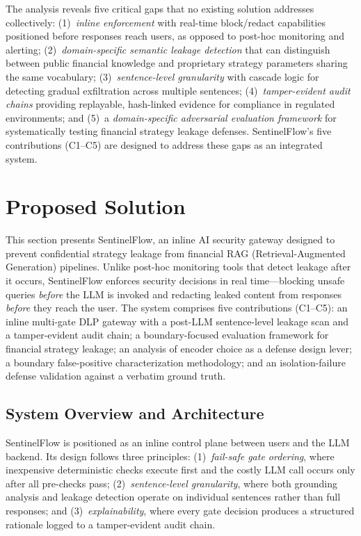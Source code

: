\documentclass[journal]{IEEEtran}
\begin{document}
The analysis reveals five critical gaps that no existing solution addresses collectively: (1)~\textit{inline enforcement} with real-time block/redact capabilities positioned before responses reach users, as opposed to post-hoc monitoring and alerting; (2)~\textit{domain-specific semantic leakage detection} that can distinguish between public financial knowledge and proprietary strategy parameters sharing the same vocabulary; (3)~\textit{sentence-level granularity} with cascade logic for detecting gradual exfiltration across multiple sentences; (4)~\textit{tamper-evident audit chains} providing replayable, hash-linked evidence for compliance in regulated environments; and (5)~a \textit{domain-specific adversarial evaluation framework} for systematically testing financial strategy leakage defenses. SentinelFlow's five contributions (C1--C5) are designed to address these gaps as an integrated system.

\section{Proposed Solution}
\label{Sect:Proposed_Solution}
This section presents SentinelFlow, an inline AI security gateway designed to prevent confidential strategy leakage from financial RAG (Retrieval-Augmented Generation) pipelines. Unlike post-hoc monitoring tools that detect leakage after it occurs, SentinelFlow enforces security decisions in real time---blocking unsafe queries \textit{before} the LLM is invoked and redacting leaked content from responses \textit{before} they reach the user. The system comprises five contributions (C1--C5): an inline multi-gate DLP gateway with a post-LLM sentence-level leakage scan and a tamper-evident audit chain; a boundary-focused evaluation framework for financial strategy leakage; an analysis of encoder choice as a defense design lever; a boundary false-positive characterization methodology; and an isolation-failure defense validation against a verbatim ground truth.


\subsection{System Overview and Architecture}
\label{Sect:System_Overview}

SentinelFlow is positioned as an inline control plane between users and the LLM backend. Its design follows three principles: (1)~\textit{fail-safe gate ordering}, where inexpensive deterministic checks execute first and the costly LLM call occurs only after all pre-checks pass; (2)~\textit{sentence-level granularity}, where both grounding analysis and leakage detection operate on individual sentences rather than full responses; and (3)~\textit{explainability}, where every gate decision produces a structured rationale logged to a tamper-evident audit chain.
\end{document}
